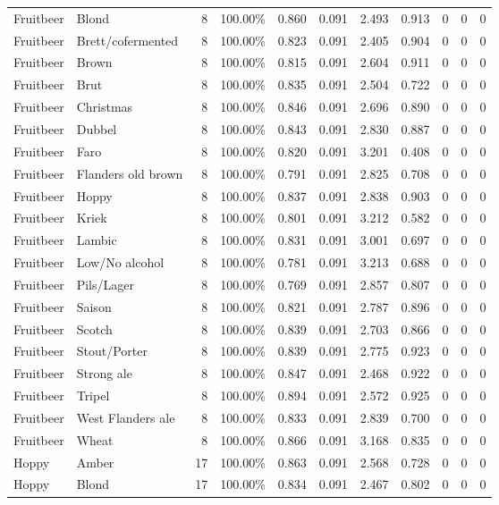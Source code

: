 {\begin{longtable}{llrrrrrrrrr}
Fruitbeer & Blond & 8 & 100.00\% & 0.860 & 0.091 & 2.493 & 0.913 & 0 & 0 & 0 \\
Fruitbeer & Brett/cofermented & 8 & 100.00\% & 0.823 & 0.091 & 2.405 & 0.904 & 0 & 0 & 0 \\
Fruitbeer & Brown & 8 & 100.00\% & 0.815 & 0.091 & 2.604 & 0.911 & 0 & 0 & 0 \\
Fruitbeer & Brut & 8 & 100.00\% & 0.835 & 0.091 & 2.504 & 0.722 & 0 & 0 & 0 \\
Fruitbeer & Christmas & 8 & 100.00\% & 0.846 & 0.091 & 2.696 & 0.890 & 0 & 0 & 0 \\
Fruitbeer & Dubbel & 8 & 100.00\% & 0.843 & 0.091 & 2.830 & 0.887 & 0 & 0 & 0 \\
Fruitbeer & Faro & 8 & 100.00\% & 0.820 & 0.091 & 3.201 & 0.408 & 0 & 0 & 0 \\
Fruitbeer & Flanders old brown & 8 & 100.00\% & 0.791 & 0.091 & 2.825 & 0.708 & 0 & 0 & 0 \\
Fruitbeer & Hoppy & 8 & 100.00\% & 0.837 & 0.091 & 2.838 & 0.903 & 0 & 0 & 0 \\
Fruitbeer & Kriek & 8 & 100.00\% & 0.801 & 0.091 & 3.212 & 0.582 & 0 & 0 & 0 \\
Fruitbeer & Lambic & 8 & 100.00\% & 0.831 & 0.091 & 3.001 & 0.697 & 0 & 0 & 0 \\
Fruitbeer & Low/No alcohol & 8 & 100.00\% & 0.781 & 0.091 & 3.213 & 0.688 & 0 & 0 & 0 \\
Fruitbeer & Pils/Lager & 8 & 100.00\% & 0.769 & 0.091 & 2.857 & 0.807 & 0 & 0 & 0 \\
Fruitbeer & Saison & 8 & 100.00\% & 0.821 & 0.091 & 2.787 & 0.896 & 0 & 0 & 0 \\
Fruitbeer & Scotch & 8 & 100.00\% & 0.839 & 0.091 & 2.703 & 0.866 & 0 & 0 & 0 \\
Fruitbeer & Stout/Porter & 8 & 100.00\% & 0.839 & 0.091 & 2.775 & 0.923 & 0 & 0 & 0 \\
Fruitbeer & Strong ale & 8 & 100.00\% & 0.847 & 0.091 & 2.468 & 0.922 & 0 & 0 & 0 \\
Fruitbeer & Tripel & 8 & 100.00\% & 0.894 & 0.091 & 2.572 & 0.925 & 0 & 0 & 0 \\
Fruitbeer & West Flanders ale & 8 & 100.00\% & 0.833 & 0.091 & 2.839 & 0.700 & 0 & 0 & 0 \\
Fruitbeer & Wheat & 8 & 100.00\% & 0.866 & 0.091 & 3.168 & 0.835 & 0 & 0 & 0 \\
Hoppy & Amber & 17 & 100.00\% & 0.863 & 0.091 & 2.568 & 0.728 & 0 & 0 & 0 \\
Hoppy & Blond & 17 & 100.00\% & 0.834 & 0.091 & 2.467 & 0.802 & 0 & 0 & 0 \\

\end{longtable}}
